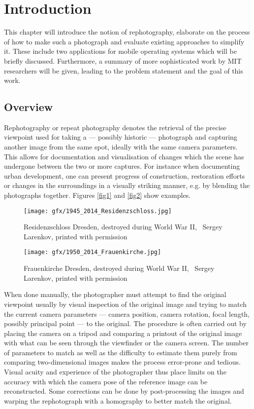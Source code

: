 \chapter{Introduction}

This chapter will introduce the notion of rephotography, elaborate on the
process of how to make such a photograph and evaluate existing approaches to
simplify it. These include two applications for mobile operating systems which
will be briefly discussed. Furthermore, a summary of more sophisticated work by
MIT researchers will be given, leading to the problem statement and the goal of
this work.

\section{Overview}

Rephotography or repeat photography denotes the retrieval of the precise viewpoint used for taking a
--- possibly historic --- photograph and capturing another image from the same
spot, ideally with the same camera parameters. This allows for documentation and
visualisation of changes which the scene has undergone between the two or more
captures.  For instance when documenting urban development, one can present
progress of construction, restoration efforts or changes in the surroundings in
a visually striking manner, e.g. by blending the photographs together.
Figures \autoref{fig1} and \autoref{fig2} show examples.

\begin{figure}
   \texttt{[image: gfx/1945\_2014\_Residenzschloss.jpg]}
   \caption{Residenzschloss Dresden, destroyed during World War II,
   \textcopyright\ Sergey Larenkov, printed with permission}
   \label{fig1}
\end{figure}

\begin{figure}
   \texttt{[image: gfx/1950\_2014\_Frauenkirche.jpg]}
   \caption{Frauenkirche Dresden, destroyed during World War II,
   \textcopyright\ Sergey Larenkov, printed with permission}
   \label{fig2}
\end{figure}

When done manually, the photographer must attempt to find the original viewpoint 
usually by visual inspection of the original image and trying to match the
current camera parameters --- camera position, camera rotation, focal length,
possibly principal point --- to the original.
The procedure is often carried out by placing the camera on a tripod and
comparing a printout of the original image with what can be seen through the
viewfinder or the camera screen. The number of parameters to match as well as
the difficulty to estimate them purely from comparing two-dimensional images makes the process
error-prone and tedious. Visual acuity and experience of the photographer thus
place limits on the accuracy with which the camera pose of the reference image
can be reconstructed. Some corrections can be done by post-processing the images
and warping the rephotograph with a homography to better match the original.

